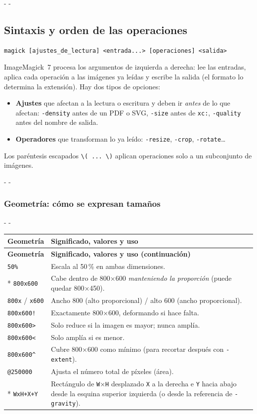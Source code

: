 \documentclass[11pt,a4paper]{article}
\makeatletter
\newcommand{\necesitaespacio}[1]{\par\penalty-100\begingroup
	\setlength{\dimen@}{#1}\dimen@ii\pagegoal\advance\dimen@ii-\pagetotal
	\ifdim\dimen@>\dimen@ii\ifdim\dimen@ii>\z@\vfil\fi\penalty-\@M\fi\endgroup}
\newenvironment{opciones}[1][Opción]{%
	\par\begingroup\small
	\begin{longtable}{L{4.25cm}L{11.2cm}}
		\toprule\rowcolor{tablacab}\cab{#1} & \cab{Significado, valores y uso} \\ \midrule
		\endfirsthead
		\toprule\rowcolor{tablacab}\cab{#1} & \cab{Significado, valores y uso (continuación)} \\ \midrule
		\endhead
		\bottomrule
		\endfoot}
	{\end{longtable}\endgroup}
\newcommand{\opt}[1]{\texttt{\textcolor{colopt}{#1}}}      %
\newcommand{\val}[1]{\texttt{#1}}                          %
\newcommand{\cab}[1]{\textbf{#1}}
\makeatother
\begin{document}
	\necesitaespacio{8\baselineskip}
	\subsection{Sintaxis y orden de las operaciones}
	
	\begin{lstlisting}[style=sintaxis]
magick [ajustes_de_lectura] <entrada...> [operaciones] <salida>
\end{lstlisting}
	
	ImageMagick~7 procesa los argumentos de izquierda a derecha: lee las entradas, aplica cada operación a las imágenes ya leídas y escribe la salida (el formato lo determina la extensión). Hay dos tipos de opciones:
	
	\begin{itemize}
		\item \textbf{Ajustes} que afectan a la lectura o escritura y deben ir \emph{antes} de lo que afectan: \opt{-density} antes de un PDF o SVG, \opt{-size} antes de \val{xc:}, \opt{-quality} antes del nombre de salida.
		\item \textbf{Operadores} que transforman lo ya leído: \opt{-resize}, \opt{-crop}, \opt{-rotate}\ldots
	\end{itemize}
	
	Los paréntesis escapados \verb|\( ... \)| aplican operaciones solo a un subconjunto de imágenes.
	
	\necesitaespacio{26\baselineskip}
	\subsubsection{Geometría: cómo se expresan tamaños}\label{sec:geometria}
	
	\necesitaespacio{22\baselineskip}
	\begin{opciones}[Geometría]
		\val{50\%} & Escala al 50\,\% en ambas dimensiones.\\*
		\val{800x600} & Cabe dentro de 800×600 \emph{manteniendo la proporción} (puede quedar 800×450).\\
		\val{800x} / \val{x600} & Ancho 800 (alto proporcional) / alto 600 (ancho proporcional).\\
		\val{800x600!} & Exactamente 800×600, deformando si hace falta.\\
		\val{800x600>} & Solo reduce si la imagen es mayor; nunca amplía.\\
		\val{800x600<} & Solo amplía si es menor.\\
		\val{800x600\^{}} & Cubre 800×600 como mínimo (para recortar después con \opt{-extent}).\\
		\val{@250000} & Ajusta el número total de píxeles (área).\\*
		\val{WxH+X+Y} & Rectángulo de \val{W}×\val{H} desplazado \val{X} a la derecha e \val{Y} hacia abajo desde la esquina superior izquierda (o desde la referencia de \opt{-gravity}).\\
	\end{opciones}
	
\end{document}
